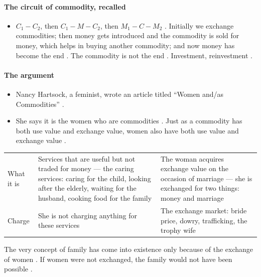 \paragraph{The circuit of commodity, recalled}
\begin{itemize}
    \item $C_1 - C_2$, then $C_1 - M - C_2$, then $M_1 - C - M_2$ . Initially we exchange commodities; then money gets introduced and the commodity is sold for money, which helps in buying another commodity; and now money has become the end . The commodity is not the end . Investment, reinvestment .
\end{itemize}

\paragraph{The argument}
\begin{itemize}
    \item Nancy Hartsock, a feminist, wrote an article titled ``Women and/as Commodities'' .
    \item She says it is the women who are commodities . Just as a commodity has both use value and exchange value, women also have both use value and exchange value .
\end{itemize}

\begin{table}[h!]
\centering
\begin{tabularx}{\textwidth}{lYY}
\toprule
{}
\thead{} &  &  \\
\midrule
What it is & Services that are useful but not traded for money --- the caring services: caring for the child, looking after the elderly, waiting for the husband, cooking food for the family & The woman acquires exchange value on the occasion of marriage --- she is exchanged for two things: money and marriage \\
Charge & She is not charging anything for these services & The exchange market: bride price, dowry, trafficking, the trophy wife \\
\bottomrule
\end{tabularx}
\end{table}

\begin{CriticalPoint}
The very concept of family has come into existence only because of the exchange of women . If women were not exchanged, the family would not have been possible .
\end{CriticalPoint}

